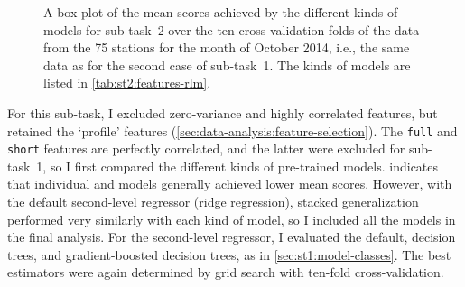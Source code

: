 \documentclass[11pt]{extarticle}
\begin{document}
\begin{figure}
  \centering
  \caption{A box plot of the mean scores achieved by the different kinds of models for
    sub-task~2 over the ten cross-validation folds of the data from the 75 stations for
    the month of October 2014, i.e., the same data as for the second case of sub-task~1.
    The kinds of models are listed in \cref{tab:st2:features-rlm}.
  }
  \label{fig:st2:box-plot}
\end{figure}

For this sub-task, I excluded zero-variance and highly correlated features, but
retained the `profile' features (\cref{sec:data-analysis:feature-selection}).
The \texttt{full} and \texttt{short} features are perfectly correlated, and the latter
were excluded for sub-task~1, so I first compared the different kinds of pre-trained
models.
 indicates that individual \rlmshort{} and \rlmshorttemp{} models
generally achieved lower mean scores.
However, with the default second-level regressor (ridge regression), stacked
generalization performed very similarly with each kind of model, so I included all the
models in the final analysis.
For the second-level regressor, I evaluated the default, decision trees, and
gradient-boosted decision trees, as in \cref{sec:st1:model-classes}.
The best estimators were again determined by grid search with ten-fold
cross-validation.
\end{document}

